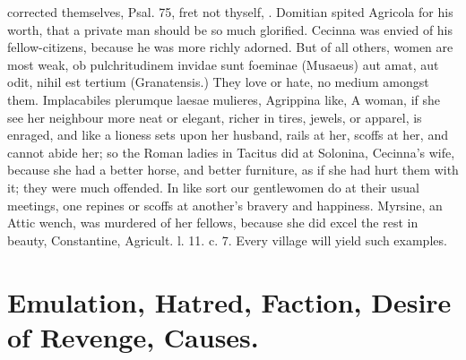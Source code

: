 {corrected themselves, Psal. 75, fret not thyself, \etc{}. Domitian spited
Agricola for his worth, that a private man should be so much
glorified. Cecinna was envied of his fellow-citizens, because he
was more richly adorned. But of all others, women are most weak,
ob pulchritudinem invidae sunt foeminae (Musaeus) aut amat, aut odit,
nihil est tertium (Granatensis.) They love or hate, no medium amongst
them. Implacabiles plerumque laesae mulieres, Agrippina like, A
woman, if she see her neighbour more neat or elegant, richer in tires,
jewels, or apparel, is enraged, and like a lioness sets upon her
husband, rails at her, scoffs at her, and cannot abide her; so the
Roman ladies in Tacitus did at Solonina, Cecinna's wife, because
she had a better horse, and better furniture, as if she had hurt them
with it; they were much offended. In like sort our gentlewomen do at
their usual meetings, one repines or scoffs at another's bravery and
happiness. Myrsine, an Attic wench, was murdered of her fellows, 
because she did excel the rest in beauty, Constantine, Agricult. l. 11.
c. 7. Every village will yield such examples.

\section{Emulation, Hatred, Faction, Desire of Revenge, Causes.}

}
